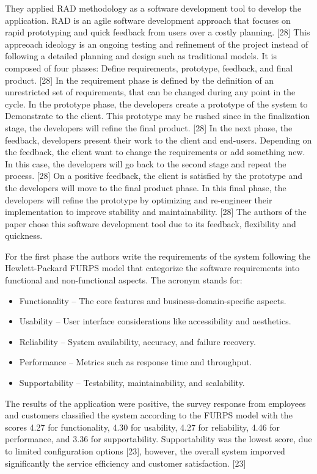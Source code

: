 They applied \ac{RAD} methodology as a software development tool to develop the application.
\ac{RAD} is an agile software development approach that focuses on rapid prototyping and quick feedback from users over a costly planning. [28]
This appreoach ideology is an ongoing testing and refinement of the project instead of following a detailed planning and design such as traditional models.
It is composed of four phases: Define requirements, prototype, feedback, and final product. [28]
In the requirement phase is defined by the definition of an unrestricted set of requirements, that can be changed during any point in the cycle. 
In the prototype phase, the developers create a prototype of the system to Demonstrate to the client. 
This prototype may be rushed since in the finalization stage, the developers will refine the final product. [28]
In the next phase, the feedback, developers present their work to the client and end-users.
Depending on the feedback, the client want to change the requirements or add something new. In this case, the developers will go back to the second stage and repeat the process. [28]
On a positive feedback, the client is satisfied by the prototype and the developers will move to the final product phase.
In this final phase, the developers will refine the prototype by optimizing and re-engineer their implementation to improve stability and maintainability. [28]
The authors of the paper chose this software development tool due to its feedback, flexibility and quickness.

For the first phase the authors write the requirements of the system following the Hewlett-Packard \ac{FURPS} model that categorize the software requirements into functional and non-functional aspects.
The acronym stands for:

\begin{itemize}
  \item Functionality – The core features and business-domain-specific aspects.
  \item Usability – User interface considerations like accessibility and aesthetics.
  \item Reliability – System availability, accuracy, and failure recovery.
  \item Performance – Metrics such as response time and throughput.
  \item Supportability – Testability, maintainability, and scalability.
\end{itemize}

The results of the application were positive, the survey response from employees and customers classified the system according to the \ac{FURPS} model with the scores 4.27 for functionality, 4.30 for usability, 4.27 for reliability, 4.46 for performance, and 3.36 for supportability.
Supportability was the lowest score, due to limited configuration options [23], however, the overall system imporved significantly the service efficiency and customer satisfaction. [23]


